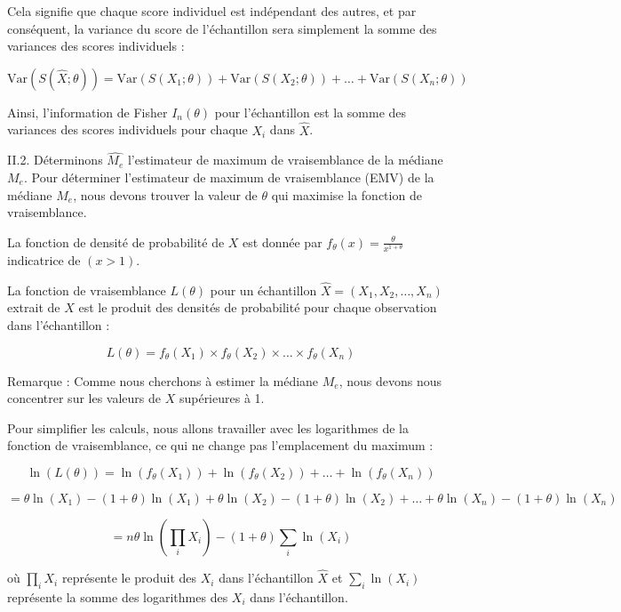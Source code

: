 \documentclass[11pt]{beamer}
\begin{document}
\begin{frame}
	 Cela signifie que chaque score individuel est indépendant des autres, et par conséquent, la variance du score de l'échantillon sera simplement la somme des variances des scores individuels :
	
	\[ \text{Var}(S(\hat{X} ; \theta)) = \text{Var}(S(X_1 ; \theta)) + \text{Var}(S(X_2 ; \theta)) + \ldots + \text{Var}(S(X_n ; \theta)) \]
	
	Ainsi, l'information de Fisher $I_n(\theta)$ pour l'échantillon est la somme des variances des scores individuels pour chaque $X_i$ dans $\hat{X}$.	
\end{frame}
\begin{frame}{II.2. Déterminons $\hat{M_e}$ l’estimateur de maximum de vraisemblance de la médiane $M_e$.}
	Pour déterminer l'estimateur de maximum de vraisemblance (EMV) de la médiane $M_e$, nous devons trouver la valeur de $\theta$ qui maximise la fonction de vraisemblance.
	
	La fonction de densité de probabilité de $X$ est donnée par $f_\theta(x) = \frac{\theta}{x^{1+\theta}}$ indicatrice de $(x > 1)$.
	
	La fonction de vraisemblance $L(\theta)$ pour un échantillon $\hat{X} = (X_1, X_2, \ldots, X_n)$ extrait de $X$ est le produit des densités de probabilité pour chaque observation dans l'échantillon :
	
	\[ L(\theta) = f_\theta(X_1) \times f_\theta(X_2) \times \ldots \times f_\theta(X_n) \]
	
	Remarque : Comme nous cherchons à estimer la médiane $M_e$, nous devons nous concentrer sur les valeurs de $X$ supérieures à 1.	
\end{frame}
\begin{frame}
Pour simplifier les calculs, nous allons travailler avec les logarithmes de la fonction de vraisemblance, ce qui ne change pas l'emplacement du maximum :

\[ \ln(L(\theta)) = \ln(f_\theta(X_1)) + \ln(f_\theta(X_2)) + \ldots + \ln(f_\theta(X_n)) \]

\[ = \theta \ln(X_1) - (1 + \theta) \ln(X_1) + \theta \ln(X_2) - (1 + \theta) \ln(X_2) + \ldots + \theta \ln(X_n) - (1 + \theta) \ln(X_n) \]

\[ = n\theta \ln\left(\prod_i X_i\right) - (1 + \theta) \sum_i \ln(X_i) \]

où $\prod_i X_i$ représente le produit des $X_i$ dans l'échantillon $\hat{X}$ et $\sum_i \ln(X_i)$ représente la somme des logarithmes des $X_i$ dans l'échantillon.
\end{frame}
\end{document}
